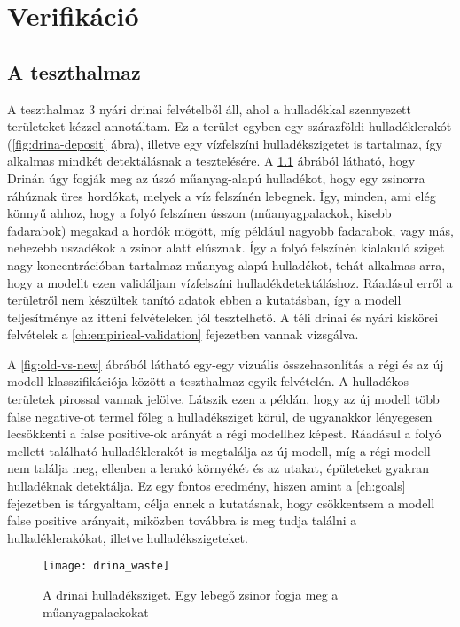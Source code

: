 \chapter {Verifikáció}
\label{ch:verification}

\section{A teszthalmaz}
\label{ch:test-set}

A teszthalmaz 3 nyári drinai felvételből áll, ahol a hulladékkal szennyezett területeket kézzel annotáltam. Ez a terület egyben egy szárazföldi hulladéklerakót (\ref{fig:drina-deposit} ábra), illetve egy vízfelszíni hulladékszigetet is tartalmaz, így alkalmas mindkét detektálásnak a tesztelésére. A \ref{fig:drina-floating-waste} ábrából látható, hogy Drinán úgy fogják meg az úszó műanyag-alapú hulladékot, hogy egy zsinorra ráhúznak üres hordókat, melyek a víz felszínén lebegnek. Így, minden, ami elég könnyű ahhoz, hogy a folyó felszínen ússzon (műanyagpalackok, kisebb fadarabok) megakad a hordók mögött, míg például nagyobb fadarabok, vagy más, nehezebb uszadékok a zsinor alatt elúsznak. Így a folyó felszínén kialakuló sziget nagy koncentrációban tartalmaz műanyag alapú hulladékot, tehát alkalmas arra, hogy a modellt ezen validáljam vízfelszíni hulladékdetektáláshoz. Ráadásul erről a területről nem készültek tanító adatok ebben a kutatásban, így a modell teljesítménye az itteni felvételeken jól tesztelhető. A téli drinai és nyári kiskörei felvételek a \ref{ch:empirical-validation} fejezetben vannak vizsgálva.

A \ref{fig:old-vs-new} ábrából látható egy-egy vizuális összehasonlítás a régi és az új modell klasszifikációja között a teszthalmaz egyik felvételén. A hulladékos területek pirossal vannak jelölve. Látszik ezen a példán, hogy az új modell több false negative-ot termel főleg a hulladéksziget körül, de ugyanakkor lényegesen lecsökkenti a false positive-ok arányát a régi modellhez képest. Ráadásul a folyó mellett található hulladéklerakót is megtalálja az új modell, míg a régi modell nem találja meg, ellenben a lerakó környékét és az utakat, épületeket gyakran hulladéknak detektálja. Ez egy fontos eredmény, hiszen amint a \ref{ch:goals} fejezetben is tárgyaltam, célja ennek a kutatásnak, hogy csökkentsem a modell false positive arányait, miközben továbbra is meg tudja találni a hulladéklerakókat, illetve hulladékszigeteket.

\begin{figure}[H]
	\centering
	\texttt{[image: drina\_waste]}
	\caption{A drinai hulladéksziget. Egy lebegő zsinor fogja meg a műanyagpalackokat \cite{euronews2024}}
    \label{fig:drina-floating-waste}
\end{figure}

